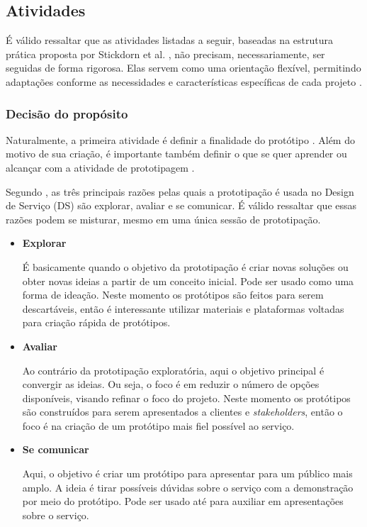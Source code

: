 \subsection{Atividades}

É válido ressaltar que as atividades listadas a seguir, baseadas na estrutura prática proposta por Stickdorn et al. \cite{Stickdorn2019}, não precisam, necessariamente, ser seguidas de forma rigorosa. Elas servem como uma orientação flexível, permitindo adaptações conforme as necessidades e características específicas de cada projeto \cite{soto2023prototyping}.

\subsubsection{Decisão do propósito}

Naturalmente, a primeira atividade é definir a finalidade do protótipo \cite{paust2025integrative}. Além do motivo de sua criação, é importante também definir o que se quer aprender ou alcançar com a atividade de prototipagem \cite{mager2023product}.

Segundo \cite{Stickdorn2019}, as três principais razões pelas quais a prototipação é usada no Design de Serviço (DS) são explorar, avaliar e se comunicar. É válido ressaltar que essas razões podem se misturar, mesmo em uma única sessão de prototipação.

\begin{itemize}
	\item \textbf{Explorar}
	
	É basicamente quando o objetivo da prototipação é criar novas soluções ou obter novas ideias a partir de um conceito inicial. Pode ser usado como uma forma de ideação. Neste momento os protótipos são feitos para serem descartáveis, então é interessante utilizar materiais e plataformas voltadas para criação rápida de protótipos.
	
	\item \textbf{Avaliar}
	
	Ao contrário da prototipação exploratória, aqui o objetivo principal é convergir as ideias. Ou seja, o foco é em reduzir o número de opções disponíveis, visando refinar o foco do projeto. Neste momento os protótipos são construídos para serem apresentados a clientes e \textit{stakeholders}, então o foco é na criação de um protótipo mais fiel possível ao serviço.
	
	\item \textbf{Se comunicar}
	
	Aqui, o objetivo é criar um protótipo para apresentar para um público mais amplo. A ideia é tirar possíveis dúvidas sobre o serviço com a demonstração por meio do protótipo. Pode ser usado até para auxiliar em apresentações sobre o serviço.
\end{itemize}

